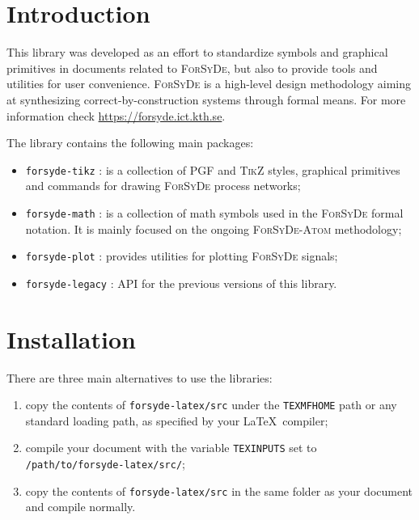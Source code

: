 \documentclass[10pt]{article}
\begin{document}
\maketitle
\reversemarginpar

\begin{abstract}
This is the reference manual for the \LaTeX\ utilities used in the context of \textsc{ForSyDe}. All packages and their API features are documented here.
\end{abstract}

\section{Introduction}

This library was developed as an effort to standardize symbols and graphical primitives in documents related to \textsc{ForSyDe}, but also to provide tools and utilities for user convenience. \textsc{ForSyDe} is a high-level design methodology aiming at synthesizing correct-by-construction systems through formal means. For more information check \url{https://forsyde.ict.kth.se}.

The library contains the following main packages:
\begin{itemize}
\item \texttt{forsyde-tikz} : is a collection of \textsc{PGF} and
  \textsc{TikZ} styles, graphical primitives and commands for
  drawing \textsc{ForSyDe} process networks;
\item \texttt{forsyde-math} : is a collection of math symbols used in
  the \textsc{ForSyDe} formal notation. It is mainly focused on the
  ongoing \textsc{ForSyDe-Atom} methodology;
\item \texttt{forsyde-plot} : provides utilities for plotting
  \textsc{ForSyDe} signals;
\item \texttt{forsyde-legacy} : API for the previous versions of this
  library.
\end{itemize}

\section{Installation}

There are three main alternatives to use the libraries:

\begin{enumerate}
\item copy the contents of \texttt{forsyde-latex/src} under the \texttt{TEXMFHOME} path or any standard loading path, as specified by your \LaTeX\ compiler;
\item compile your document with the variable \texttt{TEXINPUTS} set to \texttt{/path/to/forsyde-latex/src/};
\item copy the contents of \texttt{forsyde-latex/src} in the same folder as your document and compile normally.
\end{enumerate}
\end{document}
